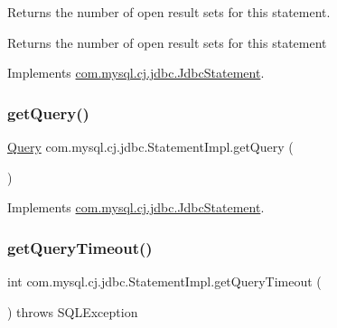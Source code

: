 Returns the number of open result sets for this statement.

\begin{DoxyReturn}{Returns}
the number of open result sets for this statement 
\end{DoxyReturn}


Implements \mbox{\hyperlink{interfacecom_1_1mysql_1_1cj_1_1jdbc_1_1_jdbc_statement_ad7367340b87accdd66c01872ebaddbcd}{com.\+mysql.\+cj.\+jdbc.\+Jdbc\+Statement}}.

\mbox{\label{classcom_1_1mysql_1_1cj_1_1jdbc_1_1_statement_impl_a03be1a8bab079e9da100366153fc4238}} 
\subsubsection{\texorpdfstring{get\+Query()}{getQuery()}}
{\footnotesize\ttfamily \mbox{\hyperlink{interfacecom_1_1mysql_1_1cj_1_1_query}{Query}} com.\+mysql.\+cj.\+jdbc.\+Statement\+Impl.\+get\+Query (\begin{DoxyParamCaption}{ }\end{DoxyParamCaption})}



Implements \mbox{\hyperlink{interfacecom_1_1mysql_1_1cj_1_1jdbc_1_1_jdbc_statement_a6ebd2f09956035be03e076980dce5528}{com.\+mysql.\+cj.\+jdbc.\+Jdbc\+Statement}}.

\mbox{\label{classcom_1_1mysql_1_1cj_1_1jdbc_1_1_statement_impl_acc6d1eb26165bde353224ca1c5d9f4cb}} 
\subsubsection{\texorpdfstring{get\+Query\+Timeout()}{getQueryTimeout()}}
{\footnotesize\ttfamily int com.\+mysql.\+cj.\+jdbc.\+Statement\+Impl.\+get\+Query\+Timeout (\begin{DoxyParamCaption}{ }\end{DoxyParamCaption}) throws S\+Q\+L\+Exception}

